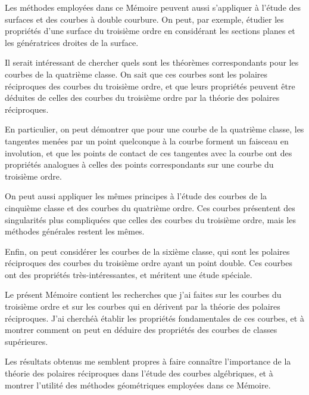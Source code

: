 \documentclass[11pt,a4paper]{article}
\begin{document}
Les m\'{e}thodes employ\'{e}es dans ce M\'{e}moire peuvent aussi s'appliquer \`{a} l'\'{e}tude des
surfaces et des courbes \`{a} double courbure. On peut, par exemple, \'{e}tudier les propri\'{e}t\'{e}s
d'une surface du troisi\`{e}me ordre en consid\'{e}rant les sections planes et les g\'{e}n\'{e}ratrices
droites de la surface.

\newpage
\setcounter{page}{194}

Il serait int\'{e}ressant de chercher quels sont les th\'{e}or\`{e}mes correspondants pour les
courbes de la quatri\`{e}me classe. On sait que ces courbes sont les polaires r\'{e}ciproques des
courbes du troisi\`{e}me ordre, et que leurs propri\'{e}t\'{e}s peuvent \^{e}tre d\'{e}duites de celles des courbes
du troisi\`{e}me ordre par la th\'{e}orie des polaires r\'{e}ciproques.

En particulier, on peut d\'{e}montrer que pour une courbe de la quatri\`{e}me classe, les
tangentes men\'{e}es par un point quelconque \`{a} la courbe forment un faisceau en involution,
et que les points de contact de ces tangentes avec la courbe ont des propri\'{e}t\'{e}s analogues
\`{a} celles des points correspondants sur une courbe du troisi\`{e}me ordre.

\newpage
\setcounter{page}{195}

On peut aussi appliquer les m\^{e}mes principes \`{a} l'\'{e}tude des courbes de la cinqui\`{e}me
classe et des courbes du quatri\`{e}me ordre. Ces courbes pr\'{e}sentent des singularit\'{e}s plus
compliqu\'{e}es que celles des courbes du troisi\`{e}me ordre, mais les m\'{e}thodes g\'{e}n\'{e}rales restent
les m\^{e}mes.

Enfin, on peut consid\'{e}rer les courbes de la sixi\`{e}me classe, qui sont les polaires
r\'{e}ciproques des courbes du troisi\`{e}me ordre ayant un point double. Ces courbes ont des
propri\'{e}t\'{e}s tr\`{e}s-int\'{e}ressantes, et m\'{e}ritent une \'{e}tude sp\'{e}ciale.

\newpage
\setcounter{page}{196}

Le pr\'{e}sent M\'{e}moire contient les recherches que j'ai faites sur les courbes du troisi\`{e}me
ordre et sur les courbes qui en d\'{e}rivent par la th\'{e}orie des polaires r\'{e}ciproques. J'ai cherch\'{e}\`{a}
\'{e}tablir les propri\'{e}t\'{e}s fondamentales de ces courbes, et \`{a} montrer comment on peut en
d\'{e}duire des propri\'{e}t\'{e}s des courbes de classes sup\'{e}rieures.

Les r\'{e}sultats obtenus me semblent propres \`{a} faire conna\^{i}tre l'importance de la th\'{e}orie
des polaires r\'{e}ciproques dans l'\'{e}tude des courbes alg\'{e}briques, et \`{a} montrer l'utilit\'{e} des
m\'{e}thodes g\'{e}om\'{e}triques employ\'{e}es dans ce M\'{e}moire.
\end{document}
